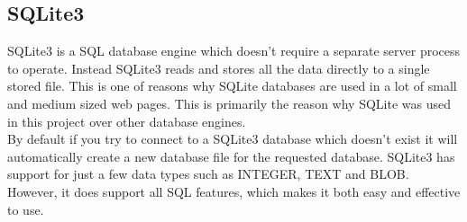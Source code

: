 \subsection{SQLite3}
SQLite3 is a SQL database engine which doesn't require a separate server process to operate. Instead SQLite3 reads and stores all the data directly to a single stored file. This is one of reasons why SQLite databases are used in a lot of small and medium sized web pages. This is primarily the reason why SQLite was used in this project over other database engines.\\
By default if you try to connect to a SQLite3 database which doesn't exist it will automatically create a new database file for the requested database. SQLite3 has support for just a few data types such as INTEGER, TEXT and BLOB. However, it does support all SQL features, which makes it both easy and effective to use.
